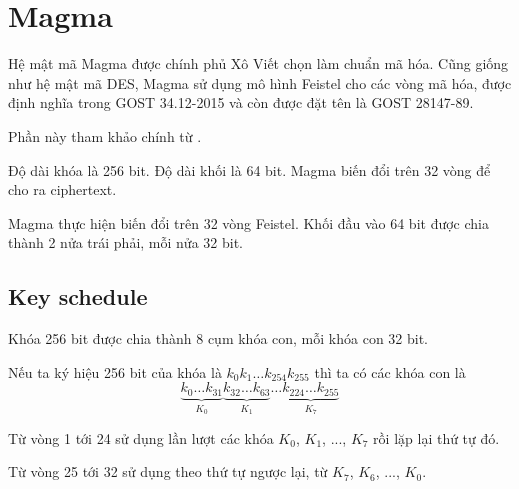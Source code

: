 \chapter{Magma}

Hệ mật mã Magma được chính phủ Xô Viết chọn làm chuẩn mã hóa.
Cũng giống như hệ mật mã DES, Magma sử dụng mô hình Feistel
cho các vòng mã hóa, được định nghĩa trong GOST 34.12-2015
và còn được đặt tên là GOST 28147-89. 

Phần này tham khảo chính từ \cite{Gashkov}.

Độ dài khóa là 256 bit. Độ dài khối là 64 bit. Magma biến
đổi trên 32 vòng để cho ra ciphertext.

Magma thực hiện biến đổi trên 32 vòng Feistel. Khối đầu vào 
64 bit được chia thành 2 nửa trái phải, mỗi nửa 32 bit.

\section{Key schedule}

Khóa 256 bit được chia thành 8 cụm khóa con, mỗi khóa con 32 bit.

Nếu ta ký hiệu 256 bit của khóa là $k_{0} k_{1} \ldots k_{254} k_{255}$
thì ta có các khóa con là
\[ \underbrace{k_0 \ldots k_{31}}_{K_0} \underbrace{k_{32} \ldots k_{63}}_{K_1}
    \ldots \underbrace{k_{224} \ldots k_{255}}_{K_7}\]

Từ vòng 1 tới 24 sử dụng lần lượt các khóa $K_0$, $K_1$, ..., $K_7$
rồi lặp lại thứ tự đó.

Từ vòng 25 tới 32 sử dụng theo thứ tự ngược lại, từ $K_7$, $K_6$, ...,
$K_0$.

